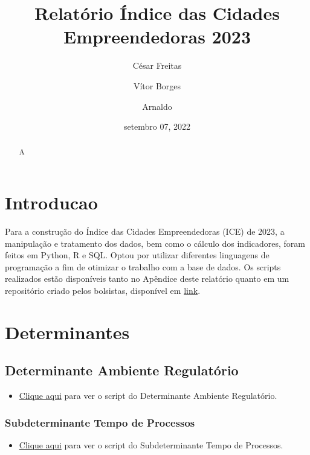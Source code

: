 \documentclass[
  12,
  dvipsnames]{article}
\title{Relatório Índice das Cidades Empreendedoras 2023}
\author{César Freitas \and Vítor Borges \and Arnaldo}
\date{setembro 07, 2022}
\providecommand{\tightlist}{%
  \setlength{\itemsep}{0pt}\setlength{\parskip}{0pt}}
\begin{document}
\maketitle
\begin{abstract}
A
\end{abstract}

\renewcommand*\contentsname{Sumário}
{
\hypersetup{linkcolor=}
\setcounter{tocdepth}{3}
\tableofcontents
}
\newpage

\hypertarget{introducao}{%
\section{Introducao}\label{introducao}}

Para a construção do Índice das Cidades Empreendedoras (ICE) de 2023, a
manipulação e tratamento dos dados, bem como o cálculo dos indicadores,
foram feitos em Python, R e SQL. Optou por utilizar diferentes
linguagens de programação a fim de otimizar o trabalho com a base de
dados. Os scripts realizados estão disponíveis tanto no Apêndice deste
relatório quanto em um repositório criado pelos bolsistas, disponível em
\href{https://github.com/ocesarfreitas/ICE-23}{link}.

\hypertarget{determinantes}{%
\section{Determinantes}\label{determinantes}}

\hypertarget{det_amb_regulatorio}{%
\subsection{Determinante Ambiente
Regulatório}\label{det_amb_regulatorio}}

\begin{itemize}
\tightlist
\item
  \protect\hyperlink{script_2.1}{Clique aqui} para ver o script do
  Determinante Ambiente Regulatório.
\end{itemize}

\hypertarget{subdet_tempo_processo}{%
\subsubsection{Subdeterminante Tempo de
Processos}\label{subdet_tempo_processo}}

\begin{itemize}
\tightlist
\item
  \protect\hyperlink{script_2.1.1}{Clique aqui} para ver o script do
  Subdeterminante Tempo de Processos.
\end{itemize}
\end{document}
